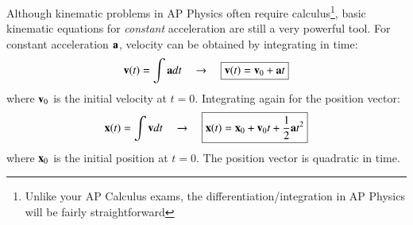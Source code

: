 \documentclass{../../oss-handout}
\newcommand{\mb}[1]{\ensuremath\mathbf{#1}}
\begin{document}
Although kinematic problems in AP Physics often require calculus\footnote{Unlike
  your AP Calculus exams, the differentiation/integration in AP Physics will be
  fairly straightforward}, basic kinematic equations for \emph{constant}
acceleration are still a very powerful tool. For constant acceleration
$\mb{a}$, velocity can be obtained by integrating in time:
\begin{equation}
  \mb{v}(t)=\int\mb{a}dt\quad\rightarrow\quad\boxed{\mb{v}(t)=\mb{v}_0+\mb{a}t}
  \label{eq:big5-1}
\end{equation}
where $\mb{v}_0$ is the initial velocity at $t=0$. Integrating again for the
position vector:
\begin{equation}
  \mb{x}(t)=\int \mb{v}dt\quad\rightarrow\quad
  \boxed{\mb{x}(t)=\mb{x}_0+\mb{v}_0t+\frac12 \mb{a}t^2}
  \label{eq:big5-2}
\end{equation}
where $\mb{x}_0$ is the initial position at $t=0$. The position vector is
quadratic in time.
\end{document}
